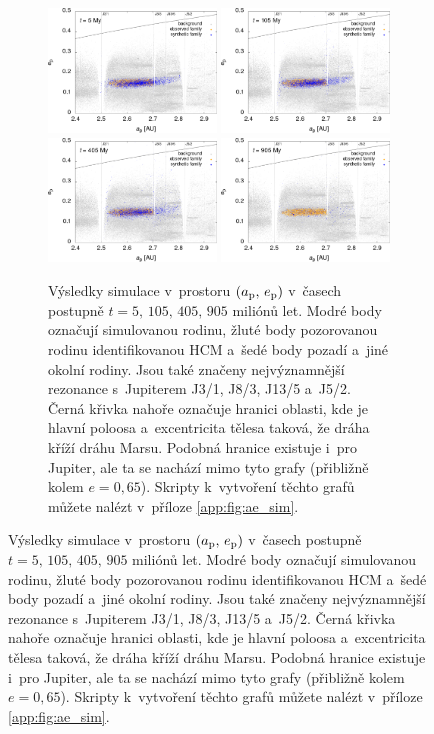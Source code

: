 \documentclass{beamer}
\newlength{\vyska}
\newlength{\vyskaB}
\newlength{\main}
\begin{document}
\begin{frame}
\begin{columns}[t]
\begin{column}{\main}
\begin{tcolorbox}[title=Výsledky\phantom{Úy},height=\vyskaB]
		\begin{figure}[t]
			\centering
			\begin{subfigure}[t]{0.49\textwidth}
			\includegraphics[width=0.49\textwidth]{../obr/ae_5t.png}
			\includegraphics[width=0.49\textwidth]{../obr/ae_105t.png}\\
			\includegraphics[width=0.49\textwidth]{../obr/ae_405t.png}
			\includegraphics[width=0.49\textwidth]{../obr/ae_905t.png}
			\caption{Výsledky simulace v~prostoru $(a_{\rm p},\,e_{\rm p})$ v~časech postupně $t=5,\,105,\,405,\,905$ miliónů let. Modré body označují simulovanou rodinu, žluté body pozorovanou rodinu identifikovanou HCM a~šedé body pozadí a~jiné okolní rodiny. Jsou také značeny nejvýznamnější rezonance s~Jupiterem J3/1, J8/3, J13/5 a~J5/2. Černá křivka nahoře označuje hranici oblasti, kde je hlavní poloosa a~excentricita tělesa taková, že dráha kříží dráhu Marsu. Podobná hranice existuje i~pro Jupiter, ale ta se nachází mimo tyto grafy (přibližně kolem $e=0,65$). Skripty k~vytvoření těchto grafů můžete nalézt v~příloze \ref{app:fig:ae_sim}.} \label{fig:ae_sim}

\end{subfigure}
\end{figure}
\end{tcolorbox}
\end{column}
\end{columns}
\end{frame}
\end{document}

